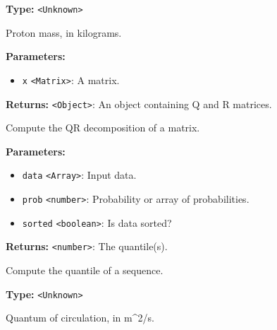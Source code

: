\documentclass[12pt,a4paper]{article}
\begin{document}
\noindent \textbf{Type:} \texttt{<Unknown>}

\noindent Proton mass, in kilograms.

\vspace{5mm}
\noindent {}


\noindent \textbf{Parameters:}
\begin{itemize}
  \item \texttt{x} \texttt{<Matrix>}: A matrix.
\end{itemize}

\noindent \textbf{Returns:} \texttt{<Object>}: An object containing Q and R matrices.

\noindent Compute the QR decomposition of a matrix.

\vspace{5mm}
\noindent {}


\noindent \textbf{Parameters:}
\begin{itemize}
  \item \texttt{data} \texttt{<Array>}: Input data.
  \item \texttt{prob} \texttt{<number>}: Probability or array of probabilities.
  \item \texttt{sorted} \texttt{<boolean>}: Is data sorted?
\end{itemize}

\noindent \textbf{Returns:} \texttt{<number>}: The quantile(s).

\noindent Compute the quantile of a sequence.

\vspace{5mm}
\noindent {}\vspace{4mm}


\noindent \textbf{Type:} \texttt{<Unknown>}

\noindent Quantum of circulation, in m\textasciicircum{}2/s.

\vspace{5mm}
\noindent {}
\end{document}
